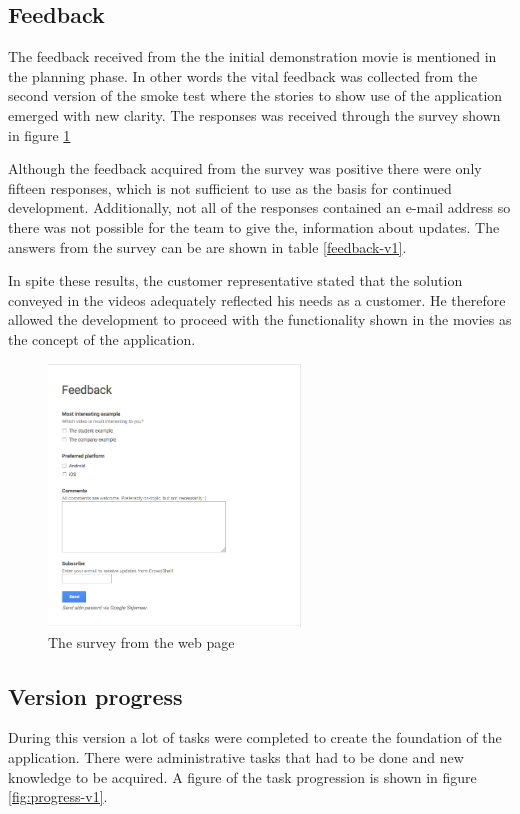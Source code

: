 \subsection{Feedback}
The feedback received from the the initial demonstration movie is mentioned in the planning phase. In other words the vital feedback was collected from the second version of the smoke test where the stories to show use of the application emerged with new clarity. The responses was received through the survey shown in figure \ref{fig:0.1-survey} 

Although the feedback acquired from the survey was positive there were only fifteen responses, which is not sufficient to use as the basis for continued development. Additionally, not all of the responses contained an e-mail address so there was not possible for the team to give the, information about updates. The answers from the survey can be are shown in table \ref{feedback-v1}.

In spite these results, the customer representative stated that the solution conveyed in the videos adequately reflected his needs as a customer. He therefore allowed the development to proceed with the functionality shown in the movies as the concept of the application.

\begin{figure}
\centering
\includegraphics[height=7cm]{figs/v01/01Survey.png}
\caption{The survey from the web page}
\label{fig:0.1-survey}
\end{figure}



\subsection{Version progress}
During this version a lot of tasks were completed to create the foundation of the application. There were administrative tasks that had to be done and new knowledge to be acquired. A figure of the task progression is shown in figure  \ref{fig:progress-v1}.


